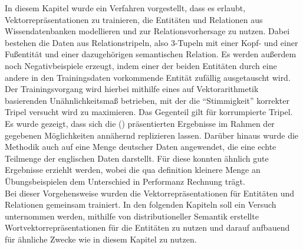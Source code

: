 In diesem Kapitel wurde ein Verfahren vorgestellt, dass es erlaubt, Vektorrepräsentationen zu trainieren, die Entitäten und Relationen
aus Wissendatenbanken modellieren und zur Relationsvorhersage zu nutzen. Dabei bestehen die Daten aus Relationstripeln,
also 3-Tupeln mit einer Kopf- und einer Fußentität und einer dazugehörigen semantischen Relation. Es werden außerdem noch
Negativbeispiele erzeugt, indem einer der beiden Entitäten durch eine andere in den Trainingsdaten vorkommende Entität zufällig ausgetauscht wird.
Der Trainingsvorgang wird hierbei mithilfe eines auf Vektorarithmetik basierenden Unähnlichkeitsmaß betrieben, mit der
die ``Stimmigkeit'' korrekter Tripel versucht wird zu maximieren. Das Gegenteil gilt für korrumpierte Tripel.\\
Es wurde gezeigt, dass sich die (\cite{bordes2011learning}) präsentierten Ergebnisse im Rahmen der gegebenen Möglichkeiten
annähernd replizieren lassen. Darüber hinaus wurde die Methodik auch auf eine Menge deutscher Daten angewendet, die eine
echte Teilmenge der englischen Daten darstellt. Für diese konnten ähnlich gute Ergebnisse erziehlt werden, wobei die qua
definition kleinere Menge an Übungsbeispielen dem Unterschied in Performanz Rechnung trägt.\\

Bei dieser Vorgehensweise wurden die Vektorrepräsentationen für Entitäten und Relationen gemeinsam trainiert. In den folgenden
Kapiteln soll ein Versuch unternommen werden, mithilfe von distributioneller Semantik erstellte Wortvektorrepräsentationen
für die Entitäten zu nutzen und darauf aufbauend für ähnliche Zwecke wie in diesem Kapitel zu nutzen.
